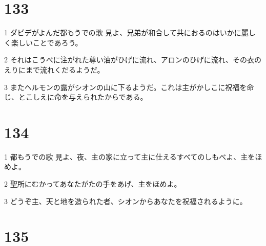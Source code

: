 \chapter{133}

\par 1 ダビデがよんだ都もうでの歌 見よ、兄弟が和合して共におるのはいかに麗しく楽しいことであろう。
\par 2 それはこうべに注がれた尊い油がひげに流れ、アロンのひげに流れ、その衣のえりにまで流れくだるようだ。
\par 3 またヘルモンの露がシオンの山に下るようだ。これは主がかしこに祝福を命じ、とこしえに命を与えられたからである。

\chapter{134}

\par 1 都もうでの歌 見よ、夜、主の家に立って主に仕えるすべてのしもべよ、主をほめよ。
\par 2 聖所にむかってあなたがたの手をあげ、主をほめよ。
\par 3 どうぞ主、天と地を造られた者、シオンからあなたを祝福されるように。

\chapter{135}

